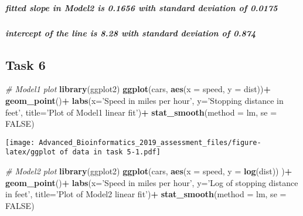 \documentclass[]{article}
\newenvironment{Shaded}{\begin{snugshade}}{\end{snugshade}}
\newcommand{\KeywordTok}[1]{\textcolor[rgb]{0.13,0.29,0.53}{\textbf{#1}}}
\newcommand{\DataTypeTok}[1]{\textcolor[rgb]{0.13,0.29,0.53}{#1}}
\newcommand{\StringTok}[1]{\textcolor[rgb]{0.31,0.60,0.02}{#1}}
\newcommand{\CommentTok}[1]{\textcolor[rgb]{0.56,0.35,0.01}{\textit{#1}}}
\newcommand{\OtherTok}[1]{\textcolor[rgb]{0.56,0.35,0.01}{#1}}
\newcommand{\OperatorTok}[1]{\textcolor[rgb]{0.81,0.36,0.00}{\textbf{#1}}}
\newcommand{\NormalTok}[1]{#1}
\let\oldsubparagraph\subparagraph
\renewcommand{\subparagraph}[1]{\oldsubparagraph{#1}\mbox{}}
\begin{document}
\subparagraph{fitted slope in Model2 is 0.1656 with standard deviation
of
0.0175}\label{fitted-slope-in-model2-is-0.1656-with-standard-deviation-of-0.0175}

\subparagraph{intercept of the line is 8.28 with standard deviation of
0.874}\label{intercept-of-the-line-is-8.28-with-standard-deviation-of-0.874}

\subsection{Task 6}\label{task-6}

\begin{Shaded}
\begin{Highlighting}[]
\CommentTok{# Model1 plot}
\KeywordTok{library}\NormalTok{(ggplot2)}
\KeywordTok{ggplot}\NormalTok{(cars, }\KeywordTok{aes}\NormalTok{(}\DataTypeTok{x =}\NormalTok{ speed, }\DataTypeTok{y =}\NormalTok{ dist))}\OperatorTok{+}
\StringTok{  }\KeywordTok{geom_point}\NormalTok{()}\OperatorTok{+}
\StringTok{  }\KeywordTok{labs}\NormalTok{(}\DataTypeTok{x=}\StringTok{'Speed in miles per hour'}\NormalTok{, }\DataTypeTok{y=}\StringTok{'Stopping distance in feet'}\NormalTok{, }\DataTypeTok{title=}\StringTok{'Plot of Model1 linear fit'}\NormalTok{)}\OperatorTok{+}
\StringTok{  }\KeywordTok{stat_smooth}\NormalTok{(}\DataTypeTok{method =}\NormalTok{ lm, }\DataTypeTok{se =} \OtherTok{FALSE}\NormalTok{)}
\end{Highlighting}
\end{Shaded}

\texttt{[image: Advanced\_Bioinformatics\_2019\_assessment\_files/figure-latex/ggplot of data in task 5-1.pdf]}

\begin{Shaded}
\begin{Highlighting}[]
\CommentTok{# Model2 plot}
\KeywordTok{library}\NormalTok{(ggplot2)}
\KeywordTok{ggplot}\NormalTok{(cars, }\KeywordTok{aes}\NormalTok{(}\DataTypeTok{x =}\NormalTok{ speed, }\DataTypeTok{y =} \KeywordTok{log}\NormalTok{(dist)) )}\OperatorTok{+}
\StringTok{  }\KeywordTok{geom_point}\NormalTok{()}\OperatorTok{+}
\StringTok{  }\KeywordTok{labs}\NormalTok{(}\DataTypeTok{x=}\StringTok{'Speed in miles per hour'}\NormalTok{, }\DataTypeTok{y=}\StringTok{'Log of stopping distance in feet'}\NormalTok{, }\DataTypeTok{title=}\StringTok{'Plot of Model2 linear fit'}\NormalTok{)}\OperatorTok{+}
\StringTok{  }\KeywordTok{stat_smooth}\NormalTok{(}\DataTypeTok{method =}\NormalTok{ lm, }\DataTypeTok{se =} \OtherTok{FALSE}\NormalTok{)}
\end{Highlighting}
\end{Shaded}
\end{document}
